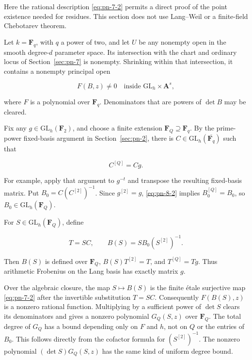 \documentclass[11pt]{article}
\begin{document}
Here the rational description \eqref{eq:pn-7-2} permits a direct proof of the point
existence needed for residues. This section does not use Lang--Weil or a
finite-field Chebotarev theorem.

Let \(k=\mathbf F_q\), with \(q\) a power of two, and let \(U\) be any
nonempty open in the smooth degree-\(d\) parameter space. Its intersection
with the chart and ordinary locus of Section~\ref{sec:pn-7} is nonempty. Shrinking
within that intersection, it contains a nonempty principal open

\begin{equation}
       F(B,z)\neq0\quad\text{inside }\mathrm{GL}_h\times\mathbf A^s,     \label{eq:pn-8-1}
\end{equation}

where \(F\) is a polynomial over \(\mathbf F_q\). Denominators that are
powers of \(\det B\) may be cleared.

Fix any \(g\in\mathrm{GL}_h(\mathbf F_2)\), and choose a finite extension
\(\mathbf F_Q\supseteq\mathbf F_q\). By the prime-power fixed-basis
argument in Section~\ref{sec:pn-2}, there is \(C\in\mathrm{GL}_h(\overline{\mathbf F_q})\)
such that

\begin{equation}
                         C^{[Q]}=Cg.                                  \label{eq:pn-8-2}
\end{equation}

For example, apply that argument to \(g^{-t}\) and transpose the resulting
fixed-basis matrix. Put \(B_0=C(C^{[2]})^{-1}\). Since \(g^{[2]}=g\),
\eqref{eq:pn-8-2} implies \(B_0^{[Q]}=B_0\), so \(B_0\in\mathrm{GL}_h(\mathbf F_Q)\).

For \(S\in\mathrm{GL}_h(\mathbf F_Q)\), define

\begin{equation}
 T=SC,\qquad B(S)=SB_0(S^{[2]})^{-1}.                                  \label{eq:pn-8-3}
\end{equation}

Then \(B(S)\) is defined over \(\mathbf F_Q\),
\(B(S)T^{[2]}=T\), and \(T^{[Q]}=Tg\). Thus arithmetic Frobenius on the
Lang basis has exactly matrix \(g\).

Over the algebraic closure, the map \(S\mapsto B(S)\) is the finite étale
surjective map \eqref{eq:pn-7-2} after the invertible substitution \(T=SC\).
Consequently \(F(B(S),z)\) is a nonzero rational function. Multiplying
by a sufficient power of \(\det S\) clears its denominators and gives a
nonzero polynomial \(G_Q(S,z)\) over \(\mathbf F_Q\). The total degree of
\(G_Q\) has a bound depending only on \(F\) and \(h\), not on \(Q\) or the
entries of \(B_0\). This follows directly from the cofactor formula for
\((S^{[2]})^{-1}\). The nonzero polynomial
\((\det S)G_Q(S,z)\) has the same kind of uniform degree bound.
\end{document}
